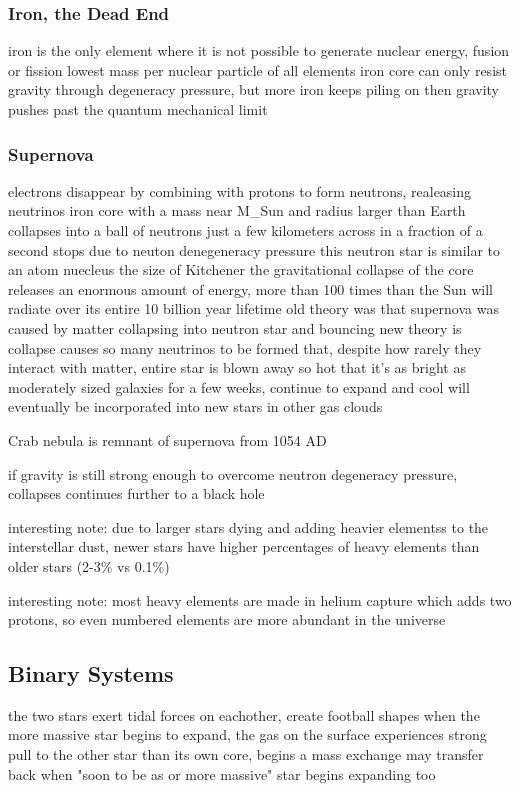     \subsubsection{Iron, the Dead End}
        iron is the only element where it is not possible to generate nuclear energy, fusion or fission
        lowest mass per nuclear particle of all elements
        iron core can only resist gravity through degeneracy pressure, but more iron keeps piling on
        then gravity pushes past the quantum mechanical limit

    \subsubsection{Supernova}
        electrons disappear by combining with protons to form neutrons, realeasing neutrinos
        iron core with a mass near M\_Sun and radius larger than Earth collapses into a ball of neutrons just a few kilometers across in a fraction of a second
        stops due to neuton denegeneracy pressure
        this neutron star is similar to an atom nuecleus the size of Kitchener
        the gravitational collapse of the core releases an enormous amount of energy, more than 100 times than the Sun will radiate over its entire 10 billion year lifetime
        old theory was that supernova was caused by matter collapsing into neutron star and bouncing
        new theory is collapse causes so many neutrinos to be formed that, despite how rarely they interact with matter, entire star is blown away
        so hot that it's as bright as moderately sized galaxies for a few weeks, continue to expand and cool
        will eventually be incorporated into new stars in other gas clouds

    Crab nebula is remnant of supernova from 1054 AD

    if gravity is still strong enough to overcome neutron degeneracy pressure, collapses continues further to a black hole

    interesting note: due to larger stars dying and adding heavier elementss to the interstellar dust, newer stars have higher percentages of heavy elements than older stars (2-3\% vs 0.1\%)

    interesting note: most heavy elements are made in helium capture which adds two protons, so even numbered elements are more abundant in the universe


\subsection{Binary Systems}
    the two stars exert tidal forces on eachother, create football shapes
    when the more massive star begins to expand, the gas on the surface experiences strong pull to the other star than its own core, begins a mass exchange
    may transfer back when "soon to be as or more massive" star begins expanding too
